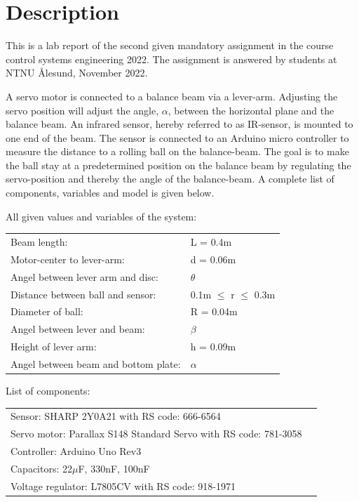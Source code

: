 \section{Description}

This is a lab report of the second given mandatory assignment in the course control systems engineering 2022. The assignment is answered by students at NTNU Ålesund, November 2022.

A servo motor is connected to a balance beam via a lever-arm. Adjusting the servo position will adjust the angle, $\alpha$, between the horizontal plane and the balance beam. An infrared sensor, hereby referred to as IR-sensor, is mounted to one end of the beam. The sensor is connected to an Arduino micro controller to measure the distance to a rolling ball on the balance-beam. The goal is to make the ball stay at a predetermined position on the balance beam by regulating the servo-position and thereby the angle of the balance-beam. A complete list of components, variables and model is given below.

All given values and variables of the system:


\begin{tabular}{ll}
Beam length:                           & L = 0.4m\\
Motor-center to lever-arm:             & d = 0.06m\\
Angel between lever arm and disc:      & $\theta$\\
Distance between ball and sensor:      & 0.1m $\leq$ r $\leq$ 0.3m\\
Diameter of ball:                      & R = 0.04m\\
Angel between lever and beam:          & $\beta$\\
Height of lever arm:                   & h = 0.09m\\
Angel between beam and bottom plate:   & $\alpha$\\
\end{tabular}                             

List of components:

\begin{tabular}{ll}
    Sensor: SHARP 2Y0A21 with RS code: 666-6564\\
    Servo motor: Parallax S148 Standard Servo with RS code: 781-3058\\
    Controller: Arduino Uno Rev3\\
    Capacitors: 22$\mu$F, 330nF, 100nF\\
    Voltage regulator: L7805CV with RS code: 918-1971
\\
    
    
    

\end{tabular}
    
